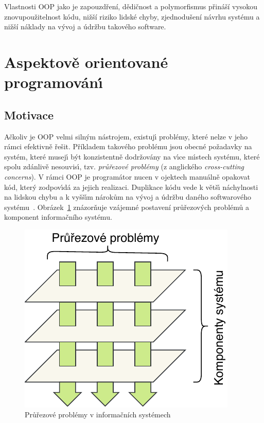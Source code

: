 Vlastnosti \gls{OOP} jako je zapouzdření, dědičnost a polymorfismus přináší
vysokou znovupoužitelnost kódu, nižší riziko lidské chyby, zjednodušení
návrhu systému a nižší náklady na vývoj a údržbu takového software.

\section{Aspektově orientované programován\'{\i}}\label{sec:aop}



\subsection{Motivace}


Ačkoliv je \gls{OOP} velmi siln\'ym nástrojem, existuj\'{\i} problémy,
které nelze v jeho rámci efektivně řešit.
Příkladem takového problému jsou obecné požadavky na systém,
které musej\'{\i} b\'yt konzistentně dodržovány na v\'{\i}ce
m\'{\i}stech systému, které spolu zdánlivě nesouvis\'{\i},
tzv. \textit{průřezové problémy} (z anglického \textit{cross-cutting concerns}).
V rámci \gls{OOP} je programátor nucen v ojektech manuálně opakovat
kód, kter\'y zodpov\'{\i}dá za jejich realizaci. Duplikace kódu
vede k větš\'{\i} náchylnosti na lidskou chybu a k vyšš\'{\i}m nárokům na v\'yvoj
a údržbu daného softwarového systému~\cite{fowler1999refactoring}.
Obrázek~\ref{fig:cross-cutting} znázorňuje vzájemné postavení průřezových
problémů a komponent informačního systému.

\begin{figure}[t]
    \centering
    \includegraphics[keepaspectratio=true, width=0.35\linewidth]{figures/cross-cutting.pdf}
    \caption{Průřezové problémy v informačních systémech}
    \label{fig:cross-cutting}
\end{figure}

